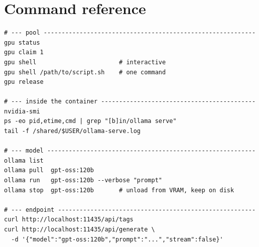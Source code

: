\section{Command reference}
\label{sec:command-reference}

\begin{lstlisting}
# --- pool -----------------------------------------------------------
gpu status
gpu claim 1
gpu shell                       # interactive
gpu shell /path/to/script.sh    # one command
gpu release

# --- inside the container -------------------------------------------
nvidia-smi
ps -eo pid,etime,cmd | grep "[b]in/ollama serve"
tail -f /shared/$USER/ollama-serve.log

# --- model ----------------------------------------------------------
ollama list
ollama pull  gpt-oss:120b
ollama run   gpt-oss:120b --verbose "prompt"
ollama stop  gpt-oss:120b       # unload from VRAM, keep on disk

# --- endpoint -------------------------------------------------------
curl http://localhost:11435/api/tags
curl http://localhost:11435/api/generate \
  -d '{"model":"gpt-oss:120b","prompt":"...","stream":false}'
\end{lstlisting}
